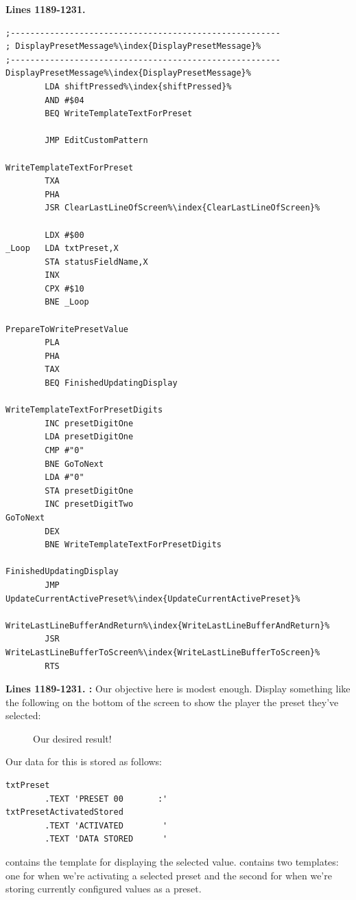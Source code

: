 \clearpage
\textbf{Lines 1189-1231. } 
\begin{lstlisting}[escapechar=\%]
;-------------------------------------------------------
; DisplayPresetMessage%\index{DisplayPresetMessage}%
;-------------------------------------------------------
DisplayPresetMessage%\index{DisplayPresetMessage}%    
        LDA shiftPressed%\index{shiftPressed}%
        AND #$04
        BEQ WriteTemplateTextForPreset

        JMP EditCustomPattern

WriteTemplateTextForPreset
        TXA 
        PHA 
        JSR ClearLastLineOfScreen%\index{ClearLastLineOfScreen}%

        LDX #$00
_Loop   LDA txtPreset,X
        STA statusFieldName,X
        INX 
        CPX #$10
        BNE _Loop

PrepareToWritePresetValue
        PLA 
        PHA 
        TAX 
        BEQ FinishedUpdatingDisplay

WriteTemplateTextForPresetDigits   
        INC presetDigitOne
        LDA presetDigitOne
        CMP #"0"
        BNE GoToNext
        LDA #"0"
        STA presetDigitOne
        INC presetDigitTwo
GoToNext   
        DEX 
        BNE WriteTemplateTextForPresetDigits

FinishedUpdatingDisplay   
        JMP UpdateCurrentActivePreset%\index{UpdateCurrentActivePreset}%

WriteLastLineBufferAndReturn%\index{WriteLastLineBufferAndReturn}%    
        JSR WriteLastLineBufferToScreen%\index{WriteLastLineBufferToScreen}%
        RTS 
\end{lstlisting}
\clearpage

\textbf{Lines 1189-1231. :} Our objective here is modest enough. Display something like the following
on the bottom of the screen to show the player the preset they've selected:
\begin{figure}[H]                                                          
  \centering                                                             
\caption{Our desired result!}
\end{figure}                                                               
\vspace*{-0.7cm}
Our data for this is stored as follows:
\begin{lstlisting}[escapechar=\%]
txtPreset
        .TEXT 'PRESET 00       :'
txtPresetActivatedStored
        .TEXT 'ACTIVATED        '
        .TEXT 'DATA STORED      '
\end{lstlisting}
 contains the template for displaying the selected value.  contains two templates: one for
when we're activating a selected preset and the second for when we're storing currently configured values as a preset.

